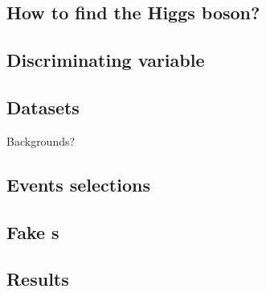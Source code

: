 \subsection*{How to find the Higgs boson?} 


\subsection*{Discriminating variable}


\subsection*{Datasets}


\begin{frame}
\begin{center}
\LARGE Backgrounds?
\end{center}
\end{frame}
\addtocounter{framenumber}{-1}




\subsection*{Events selections}


\subsection*{Fake \tauh s}


\subsection*{Results}
